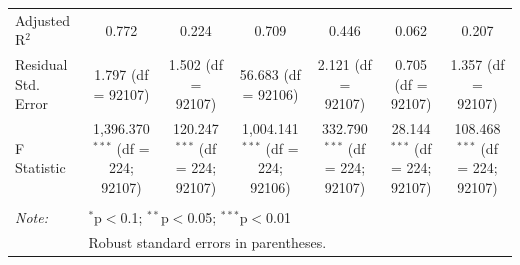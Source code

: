 \begin{table}[!htbp]
\begin{tabular}{@{\extracolsep{5pt}}lcccccc}
Adjusted R$^{2}$ & 0.772 & 0.224 & 0.709 & 0.446 & 0.062 & 0.207 \\ 
Residual Std. Error & 1.797 (df = 92107) & 1.502 (df = 92107) & 56.683 (df = 92106) & 2.121 (df = 92107) & 0.705 (df = 92107) & 1.357 (df = 92107) \\ 
F Statistic & 1,396.370$^{***}$ (df = 224; 92107) & 120.247$^{***}$ (df = 224; 92107) & 1,004.141$^{***}$ (df = 224; 92106) & 332.790$^{***}$ (df = 224; 92107) & 28.144$^{***}$ (df = 224; 92107) & 108.468$^{***}$ (df = 224; 92107) \\ 
\hline 
\hline \\[-1.8ex] 
\textit{Note:}  & \multicolumn{6}{l}{$^{*}$p$<$0.1; $^{**}$p$<$0.05; $^{***}$p$<$0.01} \\ 
 & \multicolumn{6}{l}{Robust standard errors in parentheses.} \\ 
\end{tabular} 
\end{table} 
